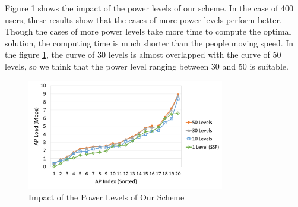 Figure \ref{fig:Levels} shows the impact of the power levels of our scheme. In the case of 400 users, these results show that the cases of more power levels perform better. Though the cases of more power levels take more time to compute the optimal solution, the computing time is much shorter than the people moving speed. In the figure \ref{fig:Levels}, the curve of 30 levels is almost overlapped with the curve of 50 levels, so we think that the power level ranging between 30 and 50 is suitable.

\begin{figure}[tbp]
\begin{center}
\includegraphics[width=3.4in]{images/Levels.png}
\end{center}
\caption{Impact of the Power Levels of Our Scheme}
\label{fig:Levels}
\end{figure}
